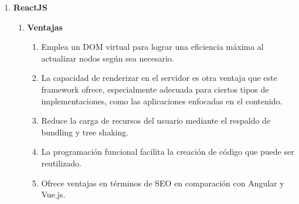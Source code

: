 \begin{enumerate}
    \item \textbf{ReactJS}
          \begin{enumerate}
              \item \textbf{Ventajas}
                    \begin{enumerate}
                        \item Emplea un DOM virtual para lograr una eficiencia máxima al actualizar nodos según sea necesario.
                        \item La capacidad de renderizar en el servidor es otra ventaja que este framework ofrece, especialmente adecuada para ciertos tipos de implementaciones, como las aplicaciones enfocadas en el contenido.
                        \item Reduce la carga de recursos del usuario mediante el respaldo de bundling y tree shaking.
                        \item La programación funcional facilita la creación de código que puede ser reutilizado.
                        \item Ofrece ventajas en términos de SEO en comparación con Angular y Vue.js.


\end{enumerate}
\end{enumerate}
\end{enumerate}
